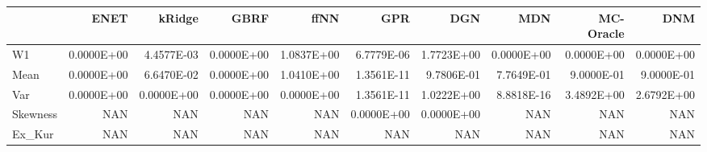 \begin{tabular}{lrrrrrrrrr}
\toprule
{} &       ENET &     kRidge &       GBRF &       ffNN &        GPR &        DGN &        MDN &  MC-Oracle &        DNM \\
\midrule
W1       & 0.0000E+00 & 4.4577E-03 & 0.0000E+00 & 1.0837E+00 & 6.7779E-06 & 1.7723E+00 & 0.0000E+00 & 0.0000E+00 & 0.0000E+00 \\
Mean     & 0.0000E+00 & 6.6470E-02 & 0.0000E+00 & 1.0410E+00 & 1.3561E-11 & 9.7806E-01 & 7.7649E-01 & 9.0000E-01 & 9.0000E-01 \\
Var      & 0.0000E+00 & 0.0000E+00 & 0.0000E+00 & 0.0000E+00 & 1.3561E-11 & 1.0222E+00 & 8.8818E-16 & 3.4892E+00 & 2.6792E+00 \\
Skewness &        NAN &        NAN &        NAN &        NAN & 0.0000E+00 & 0.0000E+00 &        NAN &        NAN &        NAN \\
Ex\_Kur   &        NAN &        NAN &        NAN &        NAN &        NAN &        NAN &        NAN &        NAN &        NAN \\
\bottomrule
\end{tabular}
